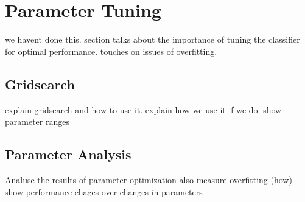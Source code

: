 \section{Parameter Tuning}\label{sec:tuning}
we havent done this.
section talks about the importance of tuning the classifier for
optimal performance.
touches on issues of overfitting.

\subsection{Gridsearch}
explain gridsearch and how to use it.
explain how we use it if we do.
show parameter ranges

\subsection{Parameter Analysis}
Analuse the results of parameter optimization
also measure overfitting (how)
show performance chages over changes in parameters
